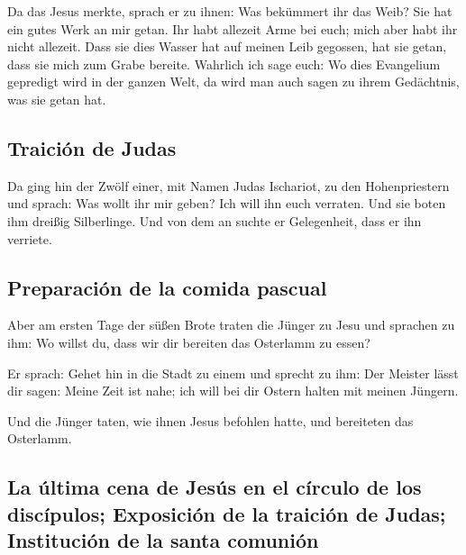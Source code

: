  Da das Jesus merkte, sprach er zu ihnen: Was bekümmert
ihr das Weib? Sie hat ein gutes Werk an mir getan.  Ihr
habt allezeit Arme bei euch; mich aber habt ihr nicht allezeit.
 Dass sie dies Wasser hat auf meinen Leib gegossen, hat
sie getan, dass sie mich zum Grabe bereite.  Wahrlich ich
sage euch: Wo dies Evangelium gepredigt wird in der ganzen Welt, da wird
man auch sagen zu ihrem Gedächtnis, was sie getan hat.

\hypertarget{traiciuxf3n-de-judas}{%
\subsection{Traición de Judas}\label{traiciuxf3n-de-judas}}

 Da ging hin der Zwölf einer, mit Namen Judas Ischariot,
zu den Hohenpriestern  und sprach: Was wollt ihr mir
geben? Ich will ihn euch verraten. Und sie boten ihm dreißig
Silberlinge.  Und von dem an suchte er Gelegenheit, dass
er ihn verriete.

\hypertarget{preparaciuxf3n-de-la-comida-pascual}{%
\subsection{Preparación de la comida
pascual}\label{preparaciuxf3n-de-la-comida-pascual}}

 Aber am ersten Tage der süßen Brote traten die Jünger zu
Jesu und sprachen zu ihm: Wo willst du, dass wir dir bereiten das
Osterlamm zu essen?

 Er sprach: Gehet hin in die Stadt zu einem und sprecht
zu ihm: Der Meister lässt dir sagen: Meine Zeit ist nahe; ich will bei
dir Ostern halten mit meinen Jüngern.

 Und die Jünger taten, wie ihnen Jesus befohlen hatte,
und bereiteten das Osterlamm.

\hypertarget{la-uxfaltima-cena-de-jesuxfas-en-el-cuxedrculo-de-los-discuxedpulos-exposiciuxf3n-de-la-traiciuxf3n-de-judas-instituciuxf3n-de-la-santa-comuniuxf3n}{%
\subsection{La última cena de Jesús en el círculo de los discípulos;
Exposición de la traición de Judas; Institución de la santa
comunión}\label{la-uxfaltima-cena-de-jesuxfas-en-el-cuxedrculo-de-los-discuxedpulos-exposiciuxf3n-de-la-traiciuxf3n-de-judas-instituciuxf3n-de-la-santa-comuniuxf3n}}

